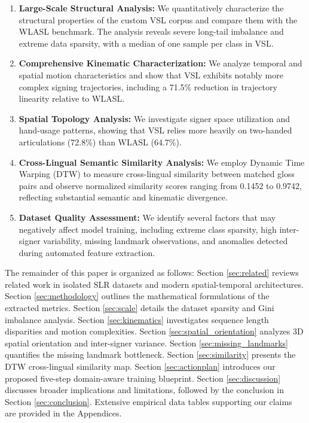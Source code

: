 \documentclass{ieeeaccess}
\DeclareRobustCommand{\textbf}[1]{{\bfseries #1}}
\begin{document}
\begin{enumerate}
\item \textbf{Large-Scale Structural Analysis:}
We quantitatively characterize the structural properties of the custom VSL corpus and compare them with the WLASL benchmark. The analysis reveals severe long-tail imbalance and extreme data sparsity, with a median of one sample per class in VSL.

\item \textbf{Comprehensive Kinematic Characterization:}
We analyze temporal and spatial motion characteristics and show that VSL exhibits notably more complex signing trajectories, including a 71.5\% reduction in trajectory linearity relative to WLASL.

\item \textbf{Spatial Topology Analysis:}
We investigate signer space utilization and hand-usage patterns, showing that VSL relies more heavily on two-handed articulations (72.8\%) than WLASL (64.7\%).

\item \textbf{Cross-Lingual Semantic Similarity Analysis:}
We employ Dynamic Time Warping (DTW) to measure cross-lingual similarity between matched gloss pairs and observe normalized similarity scores ranging from 0.1452 to 0.9742, reflecting substantial semantic and kinematic divergence.

\item \textbf{Dataset Quality Assessment:}
We identify several factors that may negatively affect model training, including extreme class sparsity, high inter-signer variability, missing landmark observations, and anomalies detected during automated feature extraction.
\end{enumerate}

The remainder of this paper is organized as follows: Section \ref{sec:related} reviews related work in isolated SLR datasets and modern spatial-temporal architectures. Section \ref{sec:methodology} outlines the mathematical formulations of the extracted metrics. Section \ref{sec:scale} details the dataset sparsity and Gini imbalance analysis. Section \ref{sec:kinematics} investigates sequence length disparities and motion complexities. Section \ref{sec:spatial_orientation} analyzes 3D spatial orientation and inter-signer variance. Section \ref{sec:missing_landmarks} quantifies the missing landmark bottleneck. Section \ref{sec:similarity} presents the DTW cross-lingual similarity map. Section \ref{sec:actionplan} introduces our proposed five-step domain-aware training blueprint. Section \ref{sec:discussion} discusses broader implications and limitations, followed by the conclusion in Section \ref{sec:conclusion}. Extensive empirical data tables supporting our claims are provided in the Appendices.
\end{document}
